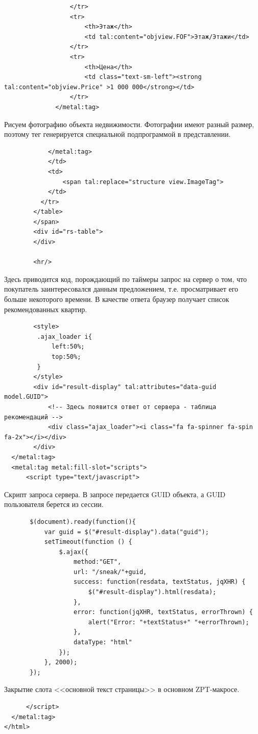 \documentclass[a4paper,14pt,openany,final]{extreport} %
\begin{document}
{\begin{verbatim}
                  </tr>
                  <tr>
                      <th>Этаж</th>
                      <td tal:content="objview.FOF">Этаж/Этажи</td>
                  </tr>
                  <tr>
                      <th>Цена</th>
                      <td class="text-sm-left"><strong tal:content="objview.Price" >1 000 000</strong></td>
                  </tr>
              </metal:tag>
\end{verbatim}
Рисуем фотографию объекта недвижимости. Фотографии имеют разный размер, поэтому тег генерируется специальной подпрограммой в представлении.
\begin{verbatim}
            </metal:tag>
            </td>
            <td>
                <span tal:replace="structure view.ImageTag">
            </td>
          </tr>
        </table>
        </span>
        <div id="rs-table">
        </div>

        <hr/>
\end{verbatim}
Здесь приводится код, порождающий по таймеры запрос на сервер о том, что покупатель заинтересовался данным предложением, т.е. просматривает его больше некоторого времени.  В качестве ответа браузер получает список рекомендованных квартир.
\begin{verbatim}
        <style>
         .ajax_loader i{
             left:50%;
             top:50%;
         }
        </style>
        <div id="result-display" tal:attributes="data-guid model.GUID">
            <!-- Здесь появится ответ от сервера - таблица рекомендаций -->
            <div class="ajax_loader"><i class="fa fa-spinner fa-spin fa-2x"></i></div>
        </div>
  </metal:tag>
  <metal:tag metal:fill-slot="scripts">
      <script type="text/javascript">
\end{verbatim}
Скрипт запроса сервера. В запросе передается GUID объекта, а GUID пользователя берется из сессии.
\begin{verbatim}
       $(document).ready(function(){
           var guid = $("#result-display").data("guid");
           setTimeout(function () {
               $.ajax({
                   method:"GET",
                   url: "/sneak/"+guid,
                   success: function(resdata, textStatus, jqXHR) {
                       $("#result-display").html(resdata);
                   },
                   error: function(jqXHR, textStatus, errorThrown) {
                       alert("Error: "+textStatus+" "+errorThrown);
                   },
                   dataType: "html"
               });
           }, 2000);
       });
\end{verbatim}
Закрытие слота <<основной текст страницы>> в основном ZPT-макросе.
\begin{verbatim}
      </script>
  </metal:tag>
</html>
\end{verbatim}

}
\end{document}
